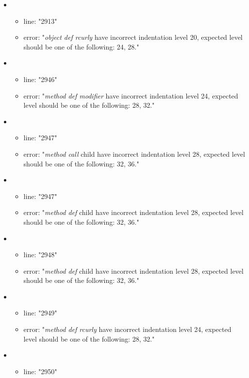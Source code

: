 \begin{itemize}
\begin{itemize}
	\end{itemize}
	\item 
	\begin{itemize} 
		\item line: "2913" 
		\item error: "\emph{object def rcurly} have incorrect indentation level 20, expected level should be one of the following: 24, 28." 
	\end{itemize}
	\item 
	\begin{itemize} 
		\item line: "2946" 
		\item error: "\emph{method def modifier} have incorrect indentation level 24, expected level should be one of the following: 28, 32." 
	\end{itemize}
	\item 
	\begin{itemize} 
		\item line: "2947" 
		\item error: "\emph{method call} child have incorrect indentation level 28, expected level should be one of the following: 32, 36." 
	\end{itemize}
	\item 
	\begin{itemize} 
		\item line: "2947" 
		\item error: "\emph{method def} child have incorrect indentation level 28, expected level should be one of the following: 32, 36." 
	\end{itemize}
	\item 
	\begin{itemize} 
		\item line: "2948" 
		\item error: "\emph{method def} child have incorrect indentation level 28, expected level should be one of the following: 32, 36." 
	\end{itemize}
	\item 
	\begin{itemize} 
		\item line: "2949" 
		\item error: "\emph{method def rcurly} have incorrect indentation level 24, expected level should be one of the following: 28, 32." 
	\end{itemize}
	\item 
	\begin{itemize} 
		\item line: "2950" 

\end{itemize}
\end{itemize}
